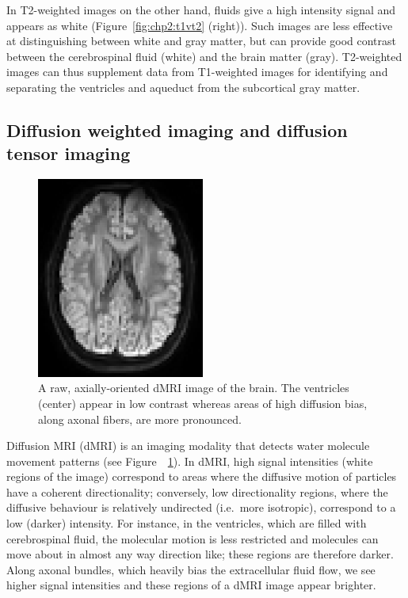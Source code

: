 In T2-weighted images on the other hand, fluids give a high intensity
signal and appears as white (Figure~\ref{fig:chp2:t1vt2}
(right)). Such images are less effective at distinguishing between
white and gray matter, but can provide good contrast between the
cerebrospinal fluid (white) and the brain matter (gray). T2-weighted
images can thus supplement data from T1-weighted images for
identifying and separating the ventricles and aqueduct from the
subcortical gray matter.

\subsection{Diffusion weighted imaging and diffusion tensor imaging}

\begin{figure}
  \sidecaption
  \centering
  \includegraphics[width=0.49\textwidth]{./chapters/chp2/FIG/DTI-slice-image-crop.png}
  \caption{A raw, axially-oriented dMRI image of the brain.  The ventricles (center) 
appear in low contrast whereas areas of high diffusion bias, along axonal fibers, 
are more pronounced.}
  \label{fig:chp2:dti}
\end{figure}

Diffusion MRI (dMRI) is an imaging modality that detects water
molecule movement patterns \cite{jeurissen2017,soares2013hitchhiker}
(see Figure~~\ref{fig:chp2:dti}). In dMRI, high signal intensities
(white regions of the image) correspond to areas where the diffusive
motion of particles have a coherent directionality; conversely, low
directionality regions, where the diffusive behaviour is relatively
undirected (i.e.~more isotropic), correspond to a low (darker)
intensity. For instance, in the ventricles, which are filled with
cerebrospinal fluid, the molecular motion is less restricted and
molecules can move about in almost any way direction like; these
regions are therefore darker.  Along axonal bundles, which heavily
bias the extracellular fluid flow, we see higher signal intensities
and these regions of a dMRI image appear brighter.


